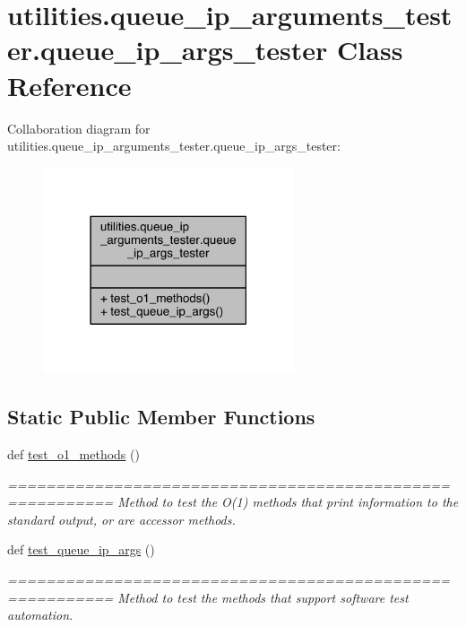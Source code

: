 \hypertarget{classutilities_1_1queue__ip__arguments__tester_1_1queue__ip__args__tester}{}\section{utilities.\+queue\+\_\+ip\+\_\+arguments\+\_\+tester.\+queue\+\_\+ip\+\_\+args\+\_\+tester Class Reference}
\label{classutilities_1_1queue__ip__arguments__tester_1_1queue__ip__args__tester}


Collaboration diagram for utilities.\+queue\+\_\+ip\+\_\+arguments\+\_\+tester.\+queue\+\_\+ip\+\_\+args\+\_\+tester\+:\nopagebreak
\begin{figure}[H]
\begin{center}
\leavevmode
\includegraphics[width=210pt]{d0/dd1/classutilities_1_1queue__ip__arguments__tester_1_1queue__ip__args__tester__coll__graph}
\end{center}
\end{figure}
\subsection*{Static Public Member Functions}
\begin{DoxyCompactItemize}
\item 
def \hyperlink{classutilities_1_1queue__ip__arguments__tester_1_1queue__ip__args__tester_a49bd049dbf616cc1f604d3c0cbe84c43}{test\+\_\+o1\+\_\+methods} ()
\begin{DoxyCompactList}\small\item\em ========================================================= Method to test the O(1) methods that print information to the standard output, or are accessor methods. \end{DoxyCompactList}\item 
def \hyperlink{classutilities_1_1queue__ip__arguments__tester_1_1queue__ip__args__tester_aee90077323d94238d7f81b23e31207c3}{test\+\_\+queue\+\_\+ip\+\_\+args} ()
\begin{DoxyCompactList}\small\item\em ========================================================= Method to test the methods that support software test automation. \end{DoxyCompactList}\end{DoxyCompactItemize}



